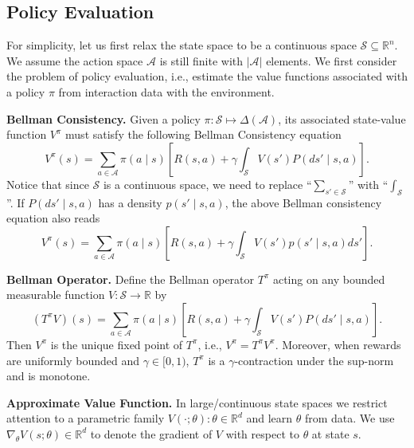 \documentclass[
]{book}
\theoremstyle{definition}
\theoremstyle{definition}
\theoremstyle{definition}
\theoremstyle{definition}
\theoremstyle{remark}
\begin{document}
\subsection{Policy Evaluation}\label{policy-evaluation-3}

For simplicity, let us first relax the state space to be a continuous space \(\mathcal{S} \subseteq \mathbb{R}^n\). We assume the action space \(\mathcal{A}\) is still finite with \(|\mathcal{A}|\) elements. We first consider the problem of policy evaluation, i.e., estimate the value functions associated with a policy \(\pi\) from interaction data with the environment.

\textbf{Bellman Consistency.} Given a policy \(\pi: \mathcal{S} \mapsto \Delta(\mathcal{A})\), its associated state-value function \(V^\pi\) must satisfy the following Bellman Consistency equation
\begin{equation}
V^{\pi}(s) = \sum_{a \in \mathcal{A}} \pi(a \mid s) \left[ R(s, a) + \gamma \int_{\mathcal{S}} V(s') P(d s' \mid s, a)  \right].
\label{eq:BellmanConsistencyContinuousStateFiniteAction}
\end{equation}
Notice that since \(\mathcal{S}\) is a continuous space, we need to replace ``\(\sum_{s' \in \mathcal{S}}\)'' with ``\(\int_{\mathcal{S}}\)''. If \(P(d s' \mid s, a)\) has a density \(p(s' \mid s, a)\), the above Bellman consistency equation also reads
\begin{equation}
V^{\pi}(s) = \sum_{a \in \mathcal{A}} \pi(a \mid s) \left[ R(s, a) + \gamma \int_{\mathcal{S}} V(s') p(s' \mid s, a) ds'  \right].
\label{eq:BellmanConsistencyContinuousStateFiniteAction-1}
\end{equation}

\textbf{Bellman Operator.} Define the Bellman operator \(T^\pi\) acting on any bounded measurable function \(V:\mathcal{S}\to\mathbb{R}\) by
\begin{equation}
(T^\pi V)(s) = \sum_{a\in\mathcal{A}} \pi(a\mid s)\left[ R(s,a) + \gamma \int_{\mathcal{S}} V(s') P(ds'\mid s,a)\right].
\label{eq:BellmanOperator}
\end{equation}
Then \(V^\pi\) is the unique fixed point of \(T^\pi\), i.e., \(V^\pi = T^\pi V^\pi\). Moreover, when rewards are uniformly bounded and \(\gamma\in[0,1)\), \(T^\pi\) is a \(\gamma\)-contraction under the sup-norm and is monotone.

\textbf{Approximate Value Function.} In large/continuous state spaces we restrict attention to a parametric family \({V(\cdot;\theta): \theta\in\mathbb{R}^d}\) and learn \(\theta\) from data. We use \(\nabla_\theta V(s;\theta) \in \mathbb{R}^d\) to denote the gradient of \(V\) with respect to \(\theta\) at state \(s\).
\end{document}

